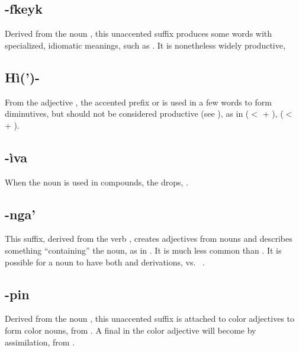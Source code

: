 \subsection{-fkeyk} Derived from the noun  , this unaccented suffix produces some words with
specialized, idiomatic meanings, such as 
.  It is none\-the\-less widely productive,  

\subsection{Hì(')-} From the adjective  , the accented
prefix  or  is used in a few words to form diminutives,
but should not be considered productive (see ),
as in   ($<$  + 
),   ($<$  +
 ).  

\subsection{-ìva} When the noun   is used
in compounds, the  drops,  
 .

\subsection{-nga'} This suffix, derived from the verb 
, creates adjectives from nouns and describes something
``containing'' the noun, as in  .  It
is much less common than .  It is possible for a noun to have
both  and  derivations,   vs.\
 .

\subsection{-pin} Derived from the noun  , this
unaccented suffix is attached to color ad\-jec\-tives to form color nouns,
\N{\ACC{rim}pin} \E{the color yellow} from \N{rim} \E{yellow}.  A
final \N{-n} in the color adjective will become \N{-m} by
assimilation,  from .

